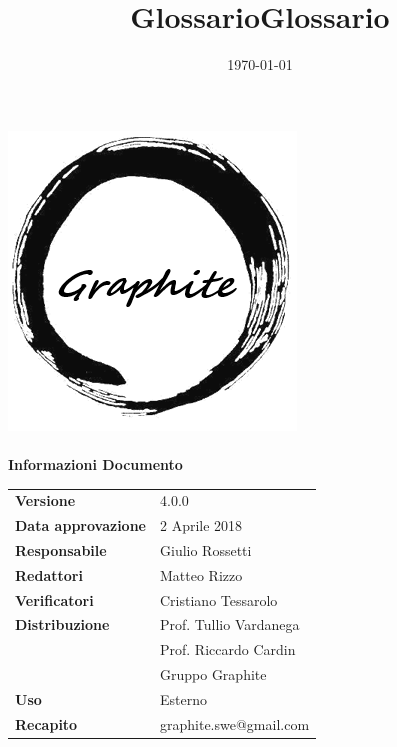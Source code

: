 \documentclass[openany,12pt,a4paper]{report}
\title{Glossario}
\author{}
\date{\today}
\title {Glossario}
\newcommand{\versione}{4.0.0}
\begin{document}
		
	\makeatletter
	\begin{titlepage}
		\setlength{\headsep}{0pt}  
		\begin{center}			
			\includegraphics[width=0.5\linewidth]{Logo.png}\\[1em]
			{\huge \bfseries  \@title }\\[10ex]
			\textbf{\Large Informazioni Documento} \\[2em]
			\bgroup
			\def\arraystretch{1.5}
			\begin{tabular}{l|l}
				\textbf{Versione} & \versione{} \\
				\textbf{Data approvazione} & 2 Aprile 2018 \\
				\textbf{Responsabile} & Giulio Rossetti \\
				\textbf{Redattori} & Matteo Rizzo \\
				\textbf{Verificatori} & Cristiano Tessarolo \\
				\textbf{Distribuzione} & Prof. Tullio Vardanega \\
				& Prof. Riccardo Cardin \\
				& Gruppo Graphite \\
				\textbf{Uso} & Esterno \\
				\textbf{Recapito} & graphite.swe@gmail.com \\
			\end{tabular}
			\egroup
		\end{center}
	\end{titlepage}
	\makeatother
	
	\thispagestyle{empty}
	\newpage
	
	
	\tableofcontents
	\printglossary[style=glossaryStyle, nonumberlist]
\end{document}
